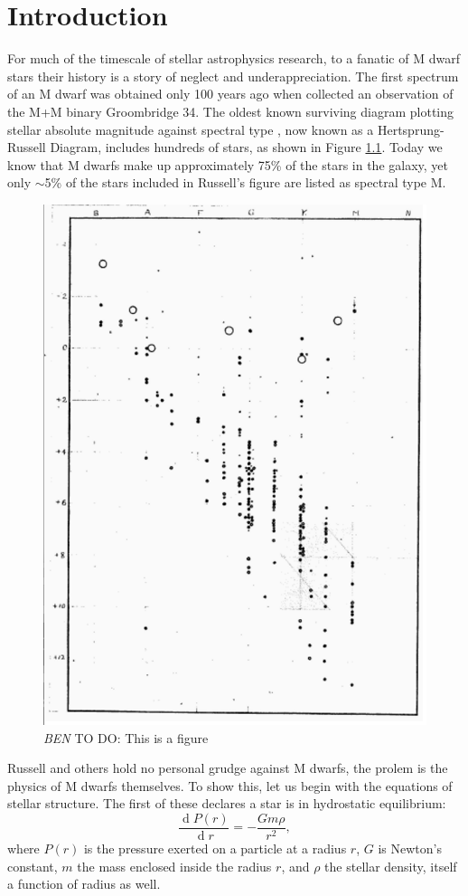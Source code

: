 \documentclass[12pt]{caltech_thesis}
\newcommand{\todo}[3]{{\color{#2} \emph{#1} TO DO: #3}}
\newcommand{\btmtodo}[1]{\todo{BEN}{red}{#1}}
\renewcommand{\d}[1]{\ensuremath{\operatorname{d}\!{#1}}}
\begin{document}
\tableofcontents
\listoffigures
\listoftables

\mainmatter

\chapter{Introduction}

For much of the timescale of stellar astrophysics research, to a fanatic 
of M dwarf stars their history is a story of neglect and underappreciation.
The first spectrum of an M dwarf was obtained only 100 years ago when 
\citet{Adams13} collected an observation of the M+M binary Groombridge 34.
The oldest known surviving diagram plotting stellar absolute magnitude against spectral type \citep{Russell14}, now known as a Hertsprung-Russell Diagram, includes hundreds of stars, as shown in Figure \ref{fig:HR}.
Today we know that M dwarfs make up approximately 75\% of the stars in the galaxy,
yet only $\sim$5\% of the stars included in Russell's figure are listed as
spectral type M.



\begin{figure}[hbt!]
\centering
\includegraphics[width=.5\textwidth]{hr.png}
\caption{\btmtodo{This is a figure}}
\label{fig:HR}
\end{figure}

Russell and others hold no personal grudge against M dwarfs, the prolem is the physics
of M dwarfs themselves.
To show this, let us begin with the equations of stellar structure.
The first of these declares a star is in hydrostatic equilibrium:
\begin{equation}
\frac{\d P(r)}{\d r} = - \frac{ G m \rho}{r^2 },
\label{eq:hydro}
\end{equation}
where $P(r)$ is the pressure exerted on a particle at a radius $r$, $G$ is Newton's
constant, $m$ the mass enclosed inside the radius $r$, and $\rho$ the stellar density,
itself a function of radius as well.
\end{document}
